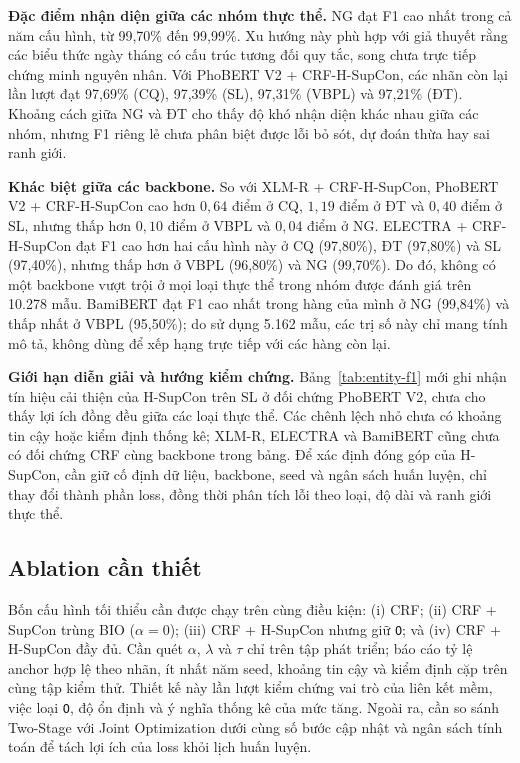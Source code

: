 \documentclass[conference,a4paper]{IEEEtran}
\begin{document}
\noindent\textbf{Đặc điểm nhận diện giữa các nhóm thực thể.}
NG đạt F1 cao nhất trong cả năm cấu hình, từ 99,70\% đến 99,99\%.
Xu hướng này phù hợp với giả thuyết rằng các biểu thức ngày tháng có
cấu trúc tương đối quy tắc, song chưa trực tiếp chứng minh nguyên nhân.
Với PhoBERT V2 + CRF-H-SupCon, các nhãn còn lại lần lượt đạt 97,69\%
(CQ), 97,39\% (SL), 97,31\% (VBPL) và 97,21\% (ĐT).
Khoảng cách giữa NG và ĐT cho thấy độ khó nhận diện khác nhau giữa các
nhóm, nhưng F1 riêng lẻ chưa phân biệt được lỗi bỏ sót, dự đoán thừa
hay sai ranh giới.

\noindent\textbf{Khác biệt giữa các backbone.}
So với XLM-R + CRF-H-SupCon, PhoBERT V2 + CRF-H-SupCon cao hơn
$0{,}64$ điểm ở CQ, $1{,}19$ điểm ở ĐT và $0{,}40$ điểm ở SL,
nhưng thấp hơn $0{,}10$ điểm ở VBPL và $0{,}04$ điểm ở NG.
ELECTRA + CRF-H-SupCon đạt F1 cao hơn hai cấu hình này ở CQ (97,80\%),
ĐT (97,80\%) và SL (97,40\%), nhưng thấp hơn ở VBPL (96,80\%) và
NG (99,70\%). Do đó, không có một backbone vượt trội ở mọi loại
thực thể trong nhóm được đánh giá trên 10.278 mẫu. BamiBERT đạt F1
cao nhất trong hàng của mình ở NG (99,84\%) và thấp nhất ở VBPL
(95,50\%); do sử dụng 5.162 mẫu, các trị số này chỉ mang tính mô tả,
không dùng để xếp hạng trực tiếp với các hàng còn lại.

\noindent\textbf{Giới hạn diễn giải và hướng kiểm chứng.}
Bảng~\ref{tab:entity-f1} mới ghi nhận tín hiệu cải thiện của H-SupCon
trên SL ở đối chứng PhoBERT V2, chưa cho thấy lợi ích đồng đều giữa
các loại thực thể. Các chênh lệch nhỏ chưa có khoảng tin cậy hoặc
kiểm định thống kê; XLM-R, ELECTRA và BamiBERT cũng chưa có đối chứng
CRF cùng backbone trong bảng. Để xác định đóng góp của H-SupCon,
cần giữ cố định dữ liệu, backbone, seed và ngân sách huấn luyện,
chỉ thay đổi thành phần loss, đồng thời phân tích lỗi theo loại,
độ dài và ranh giới thực thể.

\subsection{Ablation cần thiết}\label{subsec:resources}

Bốn cấu hình tối thiểu cần được chạy trên cùng điều kiện: (i) CRF;
(ii) CRF + SupCon trùng BIO ($\alpha=0$); (iii) CRF + H-SupCon nhưng giữ
\texttt{O}; và (iv) CRF + H-SupCon đầy đủ. Cần quét $\alpha$, $\lambda$
và $\tau$ chỉ trên tập phát triển; báo cáo tỷ lệ anchor hợp lệ theo nhãn,
ít nhất năm seed, khoảng tin cậy và kiểm định cặp trên cùng tập kiểm thử.
Thiết kế này lần lượt kiểm chứng vai trò của liên kết mềm, việc loại
\texttt{O}, độ ổn định và ý nghĩa thống kê của mức tăng. Ngoài ra, cần
so sánh Two-Stage với Joint Optimization dưới cùng số bước cập nhật và
ngân sách tính toán để tách lợi ích của loss khỏi lịch huấn luyện.
\end{document}
